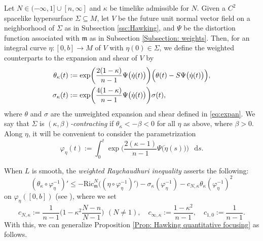 \documentclass[a4paper,11pt]{article}
\numberwithin{equation}{section}
\theoremstyle{definition}
\theoremstyle{plain}
\newcommand{\Ric}{\mathrm{Ric}}
\newcommand*\diff{\mathop{}\!\mathrm{d}}
\begin{document}
Let $N \in (-\infty,1] \cup [n,\infty]$ and $\kappa$ be timelike admissible for $N$.
Given a $C^2$ spacelike hypersurface $\Sigma \subseteq M$, let $V$ be the future unit normal vector field on a neighborhood of $\Sigma$ as in Subsection \ref{ssc:Hawking}, and $\Psi$ be the distortion function associated with $\mathfrak m$ as in Subsection \ref{Subsection: weights}. 
Then, for an integral curve $\eta:[0,b] \to M$ of $V$ with $\eta(0) \in \Sigma$, we define the weighted counterparts to the expansion and shear of $V$ by
\begin{align*}
    \theta_\kappa(t) &:= \exp\biggl( \frac{2(1-\kappa)}{n-1} \Psi\bigl(\dot{\eta}(t)\bigr) \biggr) \Bigl(\theta(t) - S\Psi\bigl(\dot{\eta}(t)\bigr)\Bigr), \\
    \sigma_\kappa(t) &:= \exp\biggl( \frac{4(1-\kappa)}{n-1} \Psi\bigl(\dot{\eta}(t)\bigr) \biggr) \sigma(t),
\end{align*}
where $\theta$ and $\sigma$ are the unweighted expansion and shear defined in \eqref{eq:expan}.
We say that $\Sigma$ is \emph{$(\kappa,\beta)$-contracting} if $\theta_\kappa < -\beta < 0$ for all $\eta$ as above, where $\beta > 0$. 
Along $\eta$, it will be convenient to consider the parametrization
\begin{equation*}
\varphi_\eta(t) :=\int_0^t \exp\biggl( \frac{2(\kappa -1)}{n-1} \Psi\bigl(\dot{\eta}(s)\bigr) \biggr) \,\diff s.
\end{equation*}

When $L$ is smooth, the \emph{weighted Raychaudhuri inequality} asserts the following:
\begin{equation}\label{eq:wRay}
(\theta_\kappa \circ \varphi_\eta^{-1})' \le -\Ric^N_{\mathfrak m} \bigl((\eta \circ \varphi_{\eta}^{-1})' \big) - \sigma_{\kappa}(\varphi_{\eta}^{-1}) -c_{N,\kappa}\theta_{\kappa}(\varphi_{\eta}^{-1})^2
\end{equation}
on $\varphi_\eta([0,b])$ (see \cite[Prop.\ 5.7]{LuMinguzziOhtaSingularity}), where we set
\begin{equation*}
c_{N,\kappa} :=\frac{1}{n-1}\biggl( 1-\kappa^2 \frac{N-n}{N-1} \biggr) \,\ (N \neq 1),
\quad c_{\infty,\kappa}:=\frac{1-\kappa^2}{n-1},
\quad c_{1,0}:=\frac{1}{n-1}.
\end{equation*}
With this, we can generalize Proposition \ref{Prop: Hawking quantitative focusing} as follows.
\end{document}
